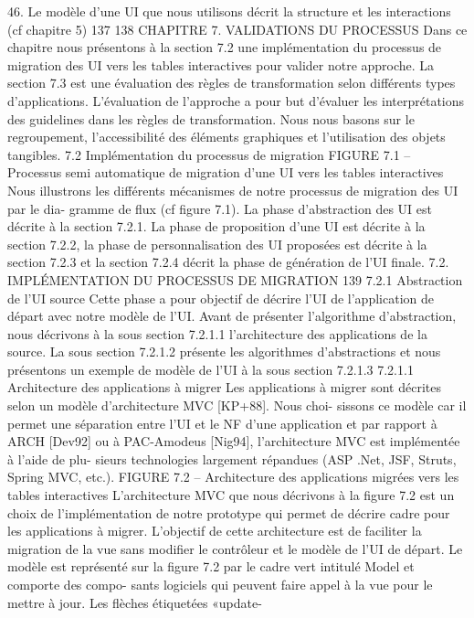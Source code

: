 \documentclass{article}
\begin{document}
46. Le modèle d’une UI que nous utilisons décrit la structure et les interactions (cf chapitre 5)
137
138
CHAPITRE 7. VALIDATIONS DU PROCESSUS
Dans ce chapitre nous présentons à la section 7.2 une implémentation du processus de migration
des UI vers les tables interactives pour valider notre approche. La section 7.3 est une évaluation des
règles de transformation selon différents types d’applications. L’évaluation de l’approche a pour but
d’évaluer les interprétations des guidelines dans les règles de transformation. Nous nous basons sur le
regroupement, l’accessibilité des éléments graphiques et l’utilisation des objets tangibles.
7.2
Implémentation du processus de migration
FIGURE 7.1 – Processus semi automatique de migration d’une UI vers les tables interactives
Nous illustrons les différents mécanismes de notre processus de migration des UI par le dia-
gramme de ﬂux (cf ﬁgure 7.1).
La phase d’abstraction des UI est décrite à la section 7.2.1. La phase de proposition d’une UI est
décrite à la section 7.2.2, la phase de personnalisation des UI proposées est décrite à la section 7.2.3
et la section 7.2.4 décrit la phase de génération de l’UI ﬁnale.
7.2. IMPLÉMENTATION DU PROCESSUS DE MIGRATION
139
7.2.1
Abstraction de l’UI source
Cette phase a pour objectif de décrire l’UI de l’application de départ avec notre modèle de l’UI.
Avant de présenter l’algorithme d’abstraction, nous décrivons à la sous section 7.2.1.1 l’architecture
des applications de la source. La sous section 7.2.1.2 présente les algorithmes d’abstractions et nous
présentons un exemple de modèle de l’UI à la sous section 7.2.1.3
7.2.1.1
Architecture des applications à migrer
Les applications à migrer sont décrites selon un modèle d’architecture MVC [KP+88]. Nous choi-
sissons ce modèle car il permet une séparation entre l’UI et le NF d’une application et par rapport à
ARCH [Dev92] ou à PAC-Amodeus [Nig94], l’architecture MVC est implémentée à l’aide de plu-
sieurs technologies largement répandues (ASP .Net, JSF, Struts, Spring MVC, etc.).
FIGURE 7.2 – Architecture des applications migrées vers les tables interactives
L’architecture MVC que nous décrivons à la ﬁgure 7.2 est un choix de l’implémentation de notre
prototype qui permet de décrire cadre pour les applications à migrer. L’objectif de cette architecture
est de faciliter la migration de la vue sans modiﬁer le contrôleur et le modèle de l’UI de départ.
Le modèle est représenté sur la ﬁgure 7.2 par le cadre vert intitulé Model et comporte des compo-
sants logiciels qui peuvent faire appel à la vue pour le mettre à jour. Les ﬂèches étiquetées «update-
\end{document}

